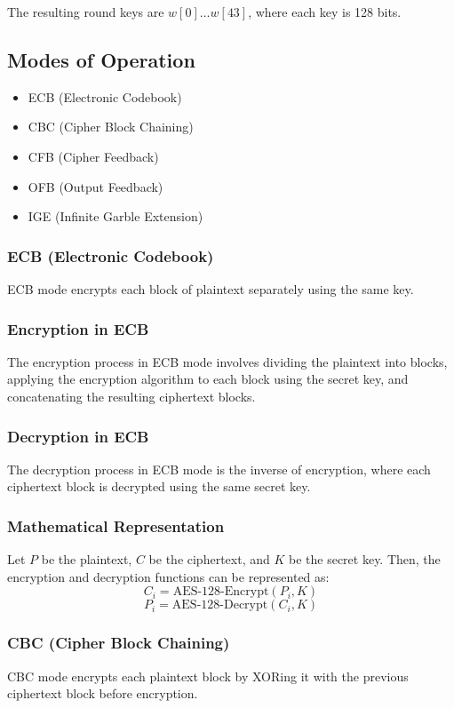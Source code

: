 \documentclass[11pt]{article}
\begin{document}
The resulting round keys are \(w[0] \ldots w[43]\), where each key is 128 bits.

\subsection*{Modes of Operation}
\begin{itemize}
    \item ECB (Electronic Codebook)
    \item CBC (Cipher Block Chaining)
    \item CFB (Cipher Feedback)
    \item OFB (Output Feedback)
    \item IGE (Infinite Garble Extension)
\end{itemize}

\subsubsection*{ECB (Electronic Codebook)}
ECB mode encrypts each block of plaintext separately using the same key.

\subsubsection*{Encryption in ECB}
The encryption process in ECB mode involves dividing the plaintext into blocks, applying the encryption algorithm to each block using the secret key, and concatenating the resulting ciphertext blocks.

\subsubsection*{Decryption in ECB}
The decryption process in ECB mode is the inverse of encryption, where each ciphertext block is decrypted using the same secret key.

\subsubsection*{Mathematical Representation}
Let \(P\) be the plaintext, \(C\) be the ciphertext, and \(K\) be the secret key. Then, the encryption and decryption functions can be represented as:
\[ C_i = \text{AES-128-Encrypt}(P_i, K) \]
\[ P_i = \text{AES-128-Decrypt}(C_i, K) \]

\subsubsection*{CBC (Cipher Block Chaining)}
CBC mode encrypts each plaintext block by XORing it with the previous ciphertext block before encryption.
\end{document}

